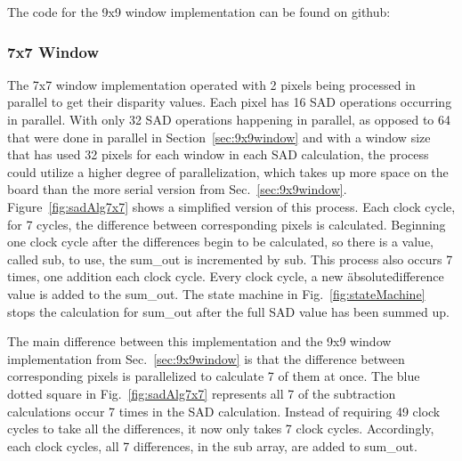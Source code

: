 The code for the 9x9 window implementation can be found on github:
\\

\subsubsection{7x7 Window}

The 7x7 window implementation operated with 2 pixels being processed in parallel to get their disparity values. Each pixel has 16 SAD operations occurring in parallel. With only 32 SAD operations happening in parallel, as opposed to 64 that were done in parallel in Section~\ref{sec:9x9window} and with a window size that has used 32 pixels for each window in each SAD calculation, the process could utilize a higher degree of parallelization, which takes up more space on the board than the more serial version from Sec.~\ref{sec:9x9window}. Figure~\ref{fig:sadAlg7x7} shows a simplified version of this process. Each clock cycle, for 7 cycles, the difference between corresponding pixels is calculated. Beginning one clock cycle after the differences begin to be calculated, so there is a value, called sub, to use, the sum\_out is incremented by sub. This process also occurs 7 times, one addition each clock cycle. Every clock cycle, a new \"absolute\" difference value is added to the sum\_out. The state machine in Fig.~\ref{fig:stateMachine} stops the calculation for sum\_out after the full SAD value has been summed up.

The main difference between this implementation and the 9x9 window implementation from Sec.~\ref{sec:9x9window} is that the difference between corresponding pixels is parallelized to calculate 7 of them at once. The blue dotted square in Fig.~\ref{fig:sadAlg7x7} represents all 7 of the subtraction calculations occur 7 times in the SAD calculation. Instead of requiring 49 clock cycles to take all the differences, it now only takes 7 clock cycles. Accordingly, each clock cycles, all 7 differences, in the sub array, are added to sum\_out.

